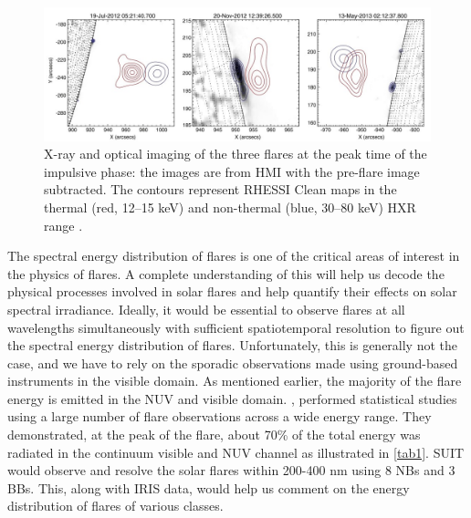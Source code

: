 \begin{figure}
    \centering
    \includegraphics[width = \linewidth]{Figures/Krucker_2015_ApJ_802_19_page-0004.jpg}
    \caption{X-ray and optical imaging of the three flares at the peak time of the impulsive phase: the images are from HMI with the pre-flare image subtracted. The contours represent RHESSI Clean maps in the thermal (red, 12–15 keV) and non-thermal (blue, 30–80 keV) HXR range \citep{krucker15}.}
    \label{fig1}
\end{figure}

The spectral energy distribution of flares is one of the critical areas of interest in the physics of flares. A complete understanding of this will help us decode the physical processes involved in solar flares and help quantify their effects on solar spectral irradiance. Ideally, it would be essential to observe flares at all wavelengths simultaneously with sufficient spatiotemporal resolution to figure out the spectral energy distribution of flares. Unfortunately, this is generally not the case, and we have to rely on the sporadic observations made using ground-based instruments in the visible domain. As mentioned earlier, the majority of the flare energy is emitted in the NUV and visible domain. \cite{kretzschmar10,kretzschmar11}, performed statistical studies using a large number of flare observations across a wide energy range. They demonstrated, at the peak of the flare, about 70\% of the total energy was radiated in the continuum visible and NUV channel as illustrated in \ref{tab1}. SUIT would observe and resolve the solar flares within 200-400 nm using 8 NBs and 3 BBs. This, along with IRIS data, would help us comment on the energy distribution of flares of various classes.

